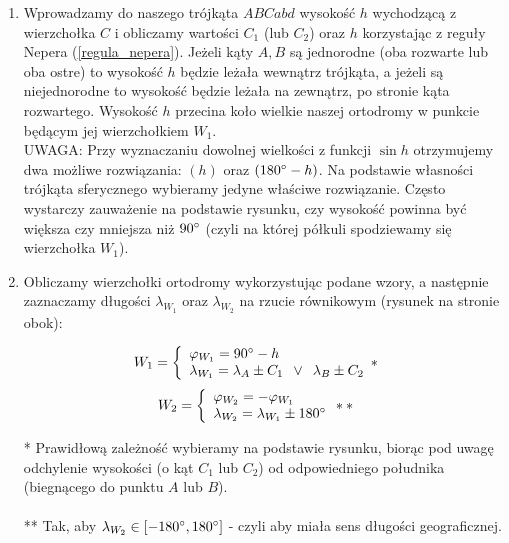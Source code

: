 \documentclass[10pt, twoside, fleqn]{article}
\begin{document}
\begin{enumerate}
				\item	Wprowadzamy do naszego trójkąta $ABCabd$ wysokość $h$
						wychodzącą z wierzchołka $C$ i obliczamy wartości $C_1$
						(lub $C_2$)
						oraz $h$ korzystając z reguły Nepera 
						(\ref{regula_nepera}). Jeżeli kąty $A,B$
						są jednorodne (oba rozwarte lub oba ostre) to wysokość $h$
						będzie leżała wewnątrz trójkąta, a jeżeli są niejednorodne
						to wysokość będzie leżała na zewnątrz, po stronie kąta
						rozwartego.
						Wysokość $h$ przecina koło wielkie naszej 
						ortodromy w punkcie będącym jej	wierzchołkiem $W_1$.
						\\UWAGA: Przy wyznaczaniu dowolnej wielkości z funkcji
						$\sin{h}$ otrzymujemy dwa możliwe rozwiązania: $(h)$ oraz 
						$(180\degree - h)$. Na podstawie własności trójkąta
						sferycznego wybieramy jedyne właściwe rozwiązanie. Często
						wystarczy zauważenie na podstawie rysunku, 
						czy wysokość powinna być większa
						czy mniejsza niż $90\degree$ (czyli na której półkuli
						spodziewamy się wierzchołka $W_1$).			
						
				\item	Obliczamy wierzchołki ortodromy wykorzystując podane
						wzory, a następnie zaznaczamy długości
						$\lambda_{W_1}$ oraz
						$\lambda_{W_2}$ na rzucie równikowym
						(rysunek na stronie obok):
						\begin{multicols}{2}
						\noindent
						\begin{align*}	
								W_1 & = \left\{
  						\begin{array}{l}
    							\varphi_{W_1} 	= 90\degree - h					\\
    							\lambda_{W_1}	= \lambda_A \pm C_1 
    											  \hspace{5pt} \vee \hspace{5pt}
    											  \lambda_B \pm C_2				\\
  						\end{array} * \right.
						\end{align*}
  						\begin{align*}
								W_2 & = \left\{
  						\begin{array}{l}
    							\varphi_{W_2} 	= -\varphi_{W_1}				\\
    							\lambda_{W_2}	= \lambda_{W_1} \pm 180\degree	\\
  						\end{array} ** \right.				
							\end{align*}
						\end{multicols}
						* Prawidłową zależność wybieramy na podstawie rysunku, 
						biorąc pod uwagę odchylenie wysokości (o kąt $C_1$ lub
						$C_2$) od odpowiedniego południka (biegnącego do punktu
						$A$ lub $B$).
							\\		\\				
						** Tak, aby $\lambda_{W_2} \in [-180\degree,180\degree]$
						- czyli aby miała sens długości geograficznej.
								
		\end{enumerate}
\end{document}
